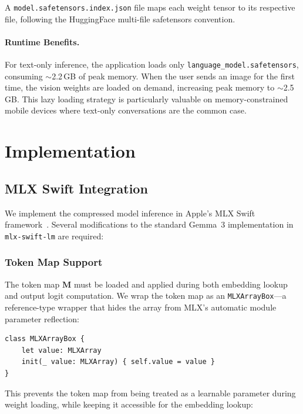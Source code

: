 \documentclass[11pt]{article}
\begin{document}
A \texttt{model.safetensors.index.json} file maps each weight tensor to its respective file, following the HuggingFace multi-file safetensors convention.

\paragraph{Runtime Benefits.} For text-only inference, the application loads only \texttt{language\_model.safetensors}, consuming $\sim$2.2\,GB of peak memory. When the user sends an image for the first time, the vision weights are loaded on demand, increasing peak memory to $\sim$2.5\,GB. This lazy loading strategy is particularly valuable on memory-constrained mobile devices where text-only conversations are the common case.

\section{Implementation}
\label{sec:implementation}

\subsection{MLX Swift Integration}

We implement the compressed model inference in Apple's MLX Swift framework~\citep{mlx,mlxswift}. Several modifications to the standard Gemma~3 implementation in \texttt{mlx-swift-lm} are required:

\subsubsection{Token Map Support}

The token map $\mathbf{M}$ must be loaded and applied during both embedding lookup and output logit computation. We wrap the token map as an \texttt{MLXArrayBox}---a reference-type wrapper that hides the array from MLX's automatic module parameter reflection:

\begin{verbatim}
class MLXArrayBox {
    let value: MLXArray
    init(_ value: MLXArray) { self.value = value }
}
\end{verbatim}

This prevents the token map from being treated as a learnable parameter during weight loading, while keeping it accessible for the embedding lookup:
\end{document}
